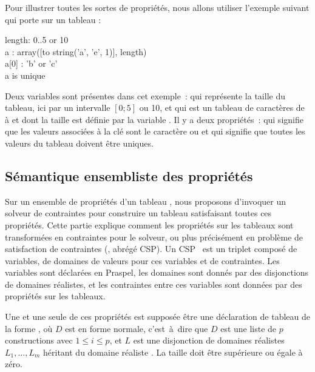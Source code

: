 \begin{example}
\label{example:data:array_proprietes}
Pour illustrer toutes les sortes de propriétés, nous allons utiliser l'exemple
suivant qui porte sur un tableau :

\begin{pre}
length: 0..5 or 10 \\
a     : array([to string('a', 'e', 1)], length) \\
a[0]  : 'b' or 'c' \\
a is unique
\end{pre}

Deux variables sont présentes dans cet exemple~:  qui représente la
taille du tableau, ici par un intervalle $[0; 5]$ ou 10, et  qui est un
tableau de caractères de  à  et dont la taille est définie par
la variable . Il y a deux propriétés~:  qui
signifie que les valeurs associées à la clé  sont le caractère
 ou  et  qui signifie que toutes les
valeurs du tableau doivent être uniques.

\end{example}

\subsection{Sémantique ensembliste des propriétés}
\label{subsection:data:solver_semantics}

Sur un ensemble de propriétés d'un tableau , nous proposons d'invoquer
un solveur de contraintes pour construire un tableau satisfaisant toutes ces
propriétés. Cette partie explique comment les propriétés sur les tableaux sont
transformées en contraintes pour le solveur, ou plus précisément en problème de
satisfaction de contraintes (, abrégé
CSP). Un CSP~ est un triplet composé de variables, de domaines de
valeurs pour ces variables et de contraintes. Les variables sont déclarées en
Praspel, les domaines sont donnés par des disjonctions de domaines réalistes, et
les contraintes entre ces variables sont données par des propriétés sur les
tableaux.

Une et une seule de ces propriétés est supposée être une déclaration de tableau
de la forme , où $D$ est en forme normale, c'est~à~dire
que $D$ est une liste de $p$ constructions  avec $1
\leq i \leq p$, et $L$ est une disjonction de domaines réalistes $L_1, \dots,
L_m$ héritant du domaine réaliste . La taille doit être supérieure
ou égale à zéro.

